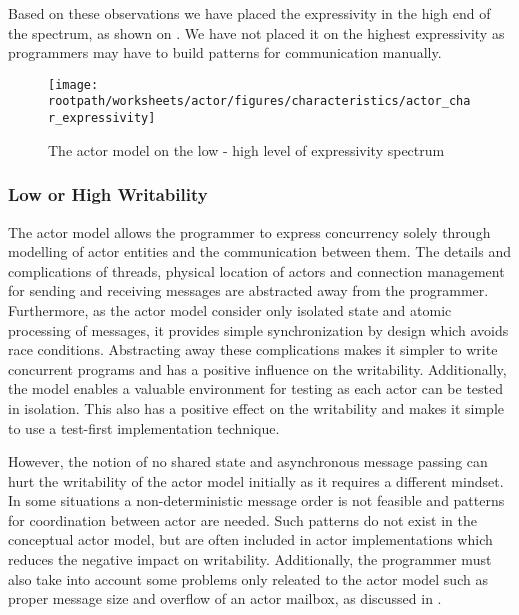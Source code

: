 Based on these observations we have placed the expressivity in the high end of the spectrum, as shown on . We have not placed it on the highest expressivity as programmers may have to build patterns for communication manually.

\begin{figure}[htbp]
\centering
 \texttt{[image: \\rootpath/worksheets/actor/figures/characteristics/actor\_char\_expressivity]} 
 \caption{The actor model on the low - high level of expressivity spectrum}
\label{fig:actor_expressivity}
\end{figure}

\subsubsection{Low or High Writability}
The actor model allows the programmer to express concurrency solely through modelling of actor entities and the communication between them. The details and complications of threads, physical location of actors and connection management for sending and receiving messages are abstracted away from the programmer. Furthermore, as the actor model consider only isolated state and atomic processing of messages, it provides simple synchronization by design which avoids race conditions. Abstracting away these complications makes it simpler to write concurrent programs and has a positive influence on the writability. Additionally, the model enables a valuable environment for testing as each actor can be tested in isolation. This also has a positive effect on the writability and makes it simple to use a test-first implementation technique.

However, the notion of no shared state and asynchronous message passing can hurt the writability of the actor model initially as it requires a different mindset. In some situations a non-deterministic message order is not feasible and patterns for coordination between actor are needed. Such patterns do not exist in the conceptual actor model, but are often included in actor implementations which reduces the negative impact on writability. Additionally, the programmer must also take into account some problems only releated to the actor model such as proper message size and overflow of an actor mailbox, as discussed in .

